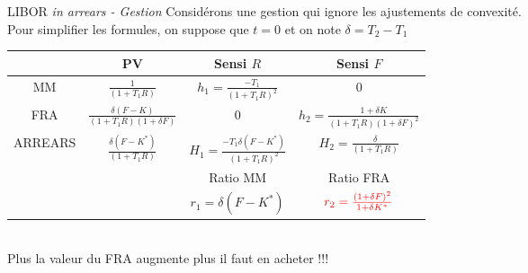 \documentclass{beamer}
\begin{document}
\begin{frame}{LIBOR \it{in arrears} \textnormal{- Gestion}}
Considérons une gestion qui ignore les ajustements de convexité.\\
\vspace{0.5cm}
Pour simplifier les formules, on suppose que $t=0$ et on note $\delta = T_2-T_1$\\
\vspace{0.5cm}
\small
\begin{tabular}{|c|c|c|c|}
\hline
& PV & Sensi $R$ & Sensi $F$\\
\hline
MM & $\frac{1}{(1+T_1 R)}$ & $h_1=\frac{-T_1}{(1+T_1 R)^2}$ & 0 \\
\hline
FRA & $\frac{\delta(F-K)}{(1+T_1 R)(1+\delta F)}$ &  0 &  $h_2=\frac{1+\delta K}{(1+ T_1 R)(1+\delta F)^2}$\\
\hline
ARREARS & $\frac{\delta(F-K^*)}{(1+T_1 R)}$ & $H_1=\frac{-T_1 \delta (F-K^*)}{(1+ T_1 R)^2}$ &  $H_2=\frac{\delta}{(1+ T_1 R)}$\\
\hline
& & Ratio MM & Ratio FRA\\
\hline
&& $r_1=\delta(F-K^*)$ & $\color{red}{r_2=\frac{ (1+\delta F)^2}{1+\delta K^*}}$\\
\hline
\end{tabular}\\
\normalsize
\vspace{0.5cm}
Plus la valeur du FRA augmente plus il faut en acheter !!!
\end{frame}
\end{document}
